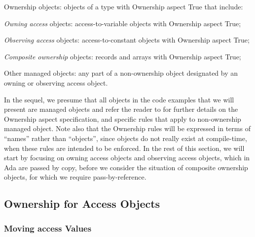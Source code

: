 \documentclass{llncs}
\begin{document}
\begin{compactitem}
\item Ownership objects: objects of a type with Ownership aspect True that include:
    \begin{compactitem}
\item \textit{Owning access} objects: access-to-variable objects with Ownership aspect True;
\item \textit{Observing access} objects: access-to-constant objects with Ownership aspect True;
\item \textit{Composite ownership} objects: records and arrays with Ownership aspect True;
    \end{compactitem}
\item Other managed objects: any part of a non-ownership object designated by an owning or observing access object.
\end{compactitem}
In the sequel, we presume that all objects in the code examples that we will present are managed objects and refer the reader to \cite{AI2017} for further details on
the Ownership aspect specification, and specific rules that apply to non-ownership managed object. Note also that the Ownership rules will be expressed in terms
of ``names'' rather than ``objects'', since objects do not really exist at compile-time, when these rules are intended to be enforced. 
In the rest of this section, we will start by focusing on owning access objects and observing access objects, which in Ada are passed by copy, before we
consider the situation of composite ownership objects, for which we require pass-by-reference.


\subsection{Ownership for Access Objects}
\label{subsec:ownershipAccess}

\subsubsection{Moving access Values}
\label{sec:moving}
\end{document}

